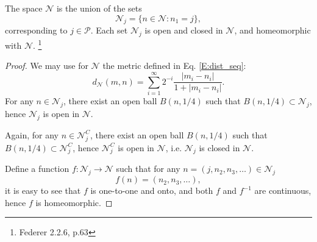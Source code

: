 \begin{lemma} \label{P:prod_sep}
The space $\mathcal{N}$ is the union of the sets
\begin{equation}
  \mathcal{N}_j = \{ n\in\mathcal{N}: n_1=j \},
\end{equation}
corresponding to $j\in\mathcal{P}$. Each set $\mathcal{N}_j$ is open and closed
in $\mathcal{N}$, and homeomorphic with $\mathcal{N}$.
\footnote{Federer 2.2.6, p.63}
\end{lemma}
\begin{proof}
We may use for $\mathcal{N}$ the metric defined in Eq. \ref{E:dist_seq}:
\[
	d_{\mathcal{N}}(m,n) 
	  = \sum_{i=1}^{\infty} 2^{-i} \frac{|m_i-n_i|}{1+|m_i-n_i|}.
\]
For any $n\in\mathcal{N}_j$, there exist an open ball $B(n,1/4)$ such that
$B(n,1/4)\subset\mathcal{N}_j$, hence $\mathcal{N}_j$ is open in $\mathcal{N}$.

Again, for any $n\in\mathcal{N}^C_j$, there exist an open ball $B(n,1/4)$ such that
$B(n,1/4)\subset\mathcal{N}^C_j$, hence $\mathcal{N}^C_j$ is open in
$\mathcal{N}$, i.e. $\mathcal{N}_j$ is closed in $\mathcal{N}$.

Define a function $f: \mathcal{N}_j \to \mathcal{N}$ such that for any 
$n=(j,n_2,n_3,\dots)\in\mathcal{N}_j$
\[
  f(n)=(n_2,n_3,\dots),
\]
it is easy to see that $f$ is one-to-one and onto, and both $f$ and 
$f^{-1}$ are continuous, hence $f$ is homeomorphic.
\end{proof}

